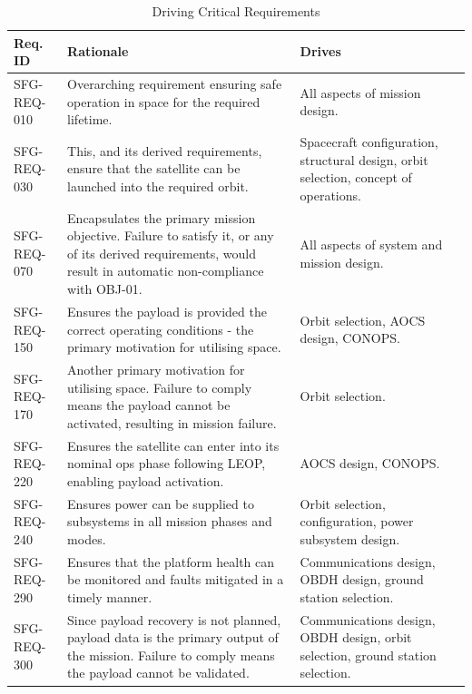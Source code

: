 \documentclass[a4paper, 11pt, conference]{IEEEtran}
\begin{document}
\begin{table}[H]
\caption{Driving Critical Requirements}
\label{tab:critical_driving_reqs}
\centering
\begin{tabularx}{\linewidth}{l X|X} %
\toprule
\textbf{Req. ID} & \textbf{Rationale} & \textbf{Drives} \\
\midrule

SFG-REQ-010 & 
Overarching requirement ensuring safe operation in space for the required lifetime.
& All aspects of mission design. \\

SFG-REQ-030 & 
This, and its derived requirements, ensure that the satellite can be launched into the required orbit. 
& Spacecraft configuration, structural design, orbit selection, concept of operations. \\

SFG-REQ-070 &
Encapsulates the primary mission objective. Failure to satisfy it, or any of its derived requirements, would result in automatic non-compliance with OBJ-01. 
& All aspects of system and mission design. \\

SFG-REQ-150 & 
Ensures the payload is provided the correct operating conditions - the primary motivation for utilising space.
& Orbit selection, AOCS design, CONOPS. \\

SFG-REQ-170 & 
Another primary motivation for utilising space. Failure to comply means the payload cannot be activated, resulting in mission failure. 
& Orbit selection. \\

SFG-REQ-220 &
Ensures the satellite can enter into its nominal ops phase following LEOP\label{nom:leop}, enabling payload activation. 
& AOCS design, CONOPS. \\

SFG-REQ-240 &
Ensures power can be supplied to subsystems in all mission phases and modes. 
& Orbit selection, configuration, power subsystem design. \\

SFG-REQ-290 &
Ensures that the platform health can be monitored and faults mitigated in a timely manner. 
& Communications design, OBDH design, ground station selection. \\

SFG-REQ-300 &
Since payload recovery is not planned, payload data is the primary output of the mission. Failure to comply means the payload cannot be validated. 
& Communications design, OBDH design, orbit selection, ground station selection. \\


\end{tabularx}
\end{table}
\end{document}
